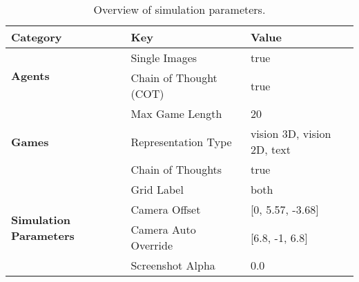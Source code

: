 \begin{table*}[h]
    \caption{Overview of simulation parameters.}
    \centering
    \renewcommand{\arraystretch}{1.2} %
    \begin{tabularx}{\textwidth}{p{5cm} p{4cm} X} 
        \toprule
        \textbf{Category} & \textbf{Key} & \textbf{Value} \\
        \midrule
        \multirow{2}{*}{\textbf{Agents}} 
         & Single Images & true \\
         & Chain of Thought (COT) & true \\
        \midrule
        \multirow{3}{*}{\textbf{Games}} 
         & Max Game Length & 20 \\
         & Representation Type & vision 3D, vision 2D, text \\
         & Chain of Thoughts & true \\
        \midrule
        \multirow{4}{*}{\textbf{Simulation Parameters}} 
         & Grid Label & both \\
         & Camera Offset & [0, 5.57, -3.68] \\
         & Camera Auto Override & [6.8, -1, 6.8] \\
         & Screenshot Alpha & 0.0 \\
        \bottomrule
    \end{tabularx}
    \label{tab:simulation_params}
\end{table*}
